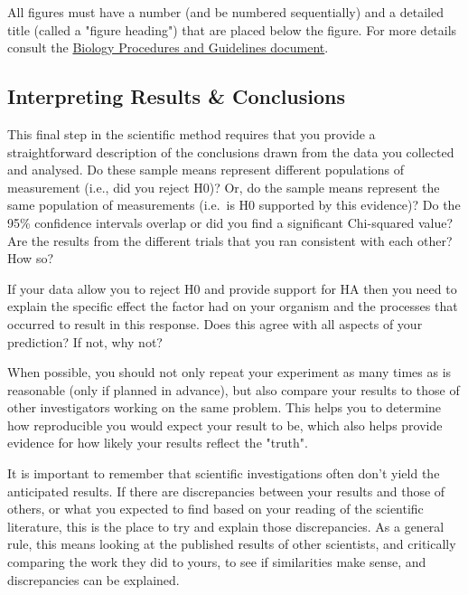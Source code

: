 \documentclass[
]{book}
\begin{document}
All figures must have a number (and be numbered sequentially) and a detailed title (called a "figure heading") that are placed below the figure. For more details consult the \href{https://ubco-biology.github.io/Procedures-and-Guidelines/figures-tables.html}{Biology Procedures and Guidelines document}.

\hypertarget{interpreting-results-conclusions}{%
\subsection*{Interpreting Results \& Conclusions}\label{interpreting-results-conclusions}}

This final step in the scientific method requires that you provide a straightforward description of the conclusions drawn from the data you collected and analysed. Do these sample means represent different populations of measurement (i.e., did you reject H0)? Or, do the sample means represent the same population of measurements (i.e.~is H0 supported by this evidence)? Do the 95\% confidence intervals overlap or did you find a significant Chi-squared value? Are the results from the different trials that you ran consistent with each other? How so?

If your data allow you to reject H0 and provide support for HA then you need to explain the specific effect the factor had on your organism and the processes that occurred to result in this response. Does this agree with all aspects of your prediction? If not, why not?

When possible, you should not only repeat your experiment as many times as is reasonable (only if planned in advance), but also compare your results to those of other investigators working on the same problem. This helps you to determine how reproducible you would expect your result to be, which also helps provide evidence for how likely your results reflect the "truth".

It is important to remember that scientific investigations often don't yield the anticipated results. If there are discrepancies between your results and those of others, or what you expected to find based on your reading of the scientific literature, this is the place to try and explain those discrepancies. As a general rule, this means looking at the published results of other scientists, and critically comparing the work they did to yours, to see if similarities make sense, and discrepancies can be explained.
\end{document}
